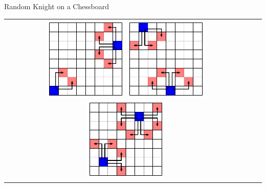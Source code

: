 \documentclass[letterpaper, mathserif]{beamer}
\begin{document}
\begin{frame}{Random Knight on a Chessboard}
\tabcolsep=0pt
\begin{tabular}{ccc}
\includegraphics[width=0.33\textwidth]{./RandomKnight/KnightMoves_Border}
\includegraphics[width=0.33\textwidth]{./RandomKnight/KnightMoves_Border2}
\includegraphics[width=0.33\textwidth]{./RandomKnight/KnightMoves_Border3}
\end{tabular}
\end{frame}
\end{document}
